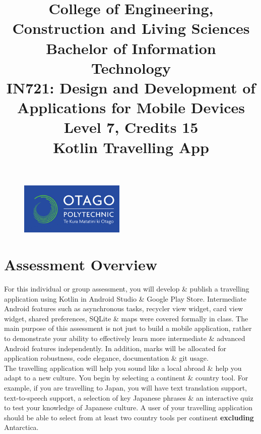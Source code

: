 \documentclass{article}
\author{}
\begin{document}
\begin{figure}
    \centering
    \includegraphics[width=50mm]{./img/logo.png}
\end{figure}

\title{College of Engineering, Construction and Living Sciences\\Bachelor of Information Technology\\IN721: Design and Development of Applications for Mobile Devices\\Level 7, Credits 15\\\textbf{Kotlin Travelling App}}
\date{}
\maketitle

\section*{Assessment Overview}
For this individual or group assessment, you will develop \& publish a travelling application using Kotlin in Android Studio \& Google Play Store. 
Intermediate Android features such as asynchronous tasks, recycler view widget, card view widget, shared preferences, SQLite \& maps were covered formally in class. The main purpose of this assessment is not just to build a mobile application, rather to demonstrate your ability to effectively learn more intermediate \& advanced Android features independently. In addition, marks will be allocated for application robustness, code elegance, documentation \& git usage. \\

The travelling application will help you sound like a local abroad \& help you adapt to a new culture. You begin by selecting a continent \& country tool. For example, if you are travelling to Japan, you will have text translation support, text-to-speech support, a selection of key Japanese phrases \& an interactive quiz to test your knowledge of Japanese culture. A user of your travelling application should be able to select from at least two country tools per continent \textbf{excluding} Antarctica.
\end{document}
